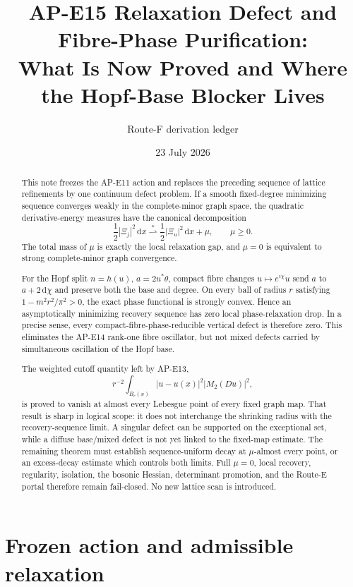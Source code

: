 \documentclass[11pt]{article}
\title{AP-E15 Relaxation Defect and Fibre-Phase Purification:\\
What Is Now Proved and Where the Hopf-Base Blocker Lives}
\author{Route-F derivation ledger}
\date{23 July 2026}
\newcommand{\dd}{\,\mathrm d}
\begin{document}
\maketitle

\begin{abstract}
This note freezes the AP-E11 action and replaces the preceding sequence of
lattice refinements by one continuum defect problem.  If a smooth
fixed-degree minimizing sequence converges weakly in the complete-minor graph
space, the quadratic derivative-energy measures have the canonical
decomposition
\[
 \frac12|\Xi_j|^2\dd x\stackrel{*}{\rightharpoonup}
 \frac12|\Xi_u|^2\dd x+\mu,\qquad \mu\geq0.
\]
The total mass of $\mu$ is exactly the local relaxation gap, and $\mu=0$ is
equivalent to strong complete-minor graph convergence.

For the Hopf split $n=h(u)$, $a=2u^*\theta$, compact fibre changes
$u\mapsto e^{i\chi}u$ send $a$ to $a+2\dd\chi$ and preserve both the base
and degree.  On every ball of radius $r$ satisfying
$1-m^2r^2/\pi^2>0$, the exact phase functional is strongly convex.  Hence an
asymptotically minimizing recovery sequence has zero local phase-relaxation
drop.  In a precise sense, every compact-fibre-phase-reducible vertical
defect is therefore zero.  This eliminates the AP-E14 rank-one fibre
oscillator, but not mixed defects carried by simultaneous oscillation of the
Hopf base.

The weighted cutoff quantity left by AP-E13,
\[
 r^{-2}\int_{B_r(x)}|u-u(x)|^2|M_2(Du)|^2,
\]
is proved to vanish at almost every Lebesgue point of every fixed graph map.
That result is sharp in logical scope: it does not interchange the shrinking
radius with the recovery-sequence limit.  A singular defect can be supported
on the exceptional set, while a diffuse base/mixed defect is not yet linked
to the fixed-map estimate.  The remaining theorem must establish
sequence-uniform decay at $\mu$-almost every point, or an excess-decay
estimate which controls both limits.  Full $\mu=0$, local recovery,
regularity, isolation, the bosonic Hessian, determinant promotion, and the
Route-E portal therefore remain fail-closed.  No new lattice scan is
introduced.
\end{abstract}

\tableofcontents

\section{Frozen action and admissible relaxation}
\end{document}
